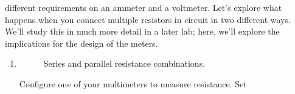 \documentclass[12pt]{article}
\begin{document}
\begin{enumerate}
  different requirements on an ammeter and a voltmeter.  Let's explore
  what happens when you connect multiple resistors in circuit in two
  different ways.  We'll study this in much more detail in a later
  lab; here, we'll explore the implications for the design of the
  meters. 
  \begin{enumerate}
  \item \label{item:identical}
    \begin{figure}
      \centering
      \qquad {}
      \caption{Series and parallel resistance combinations.}
      \label{fig:resistances}
    \end{figure}
    Configure one of your multimeters to measure resistance.  Set

\end{enumerate}
\end{enumerate}
\end{document}
